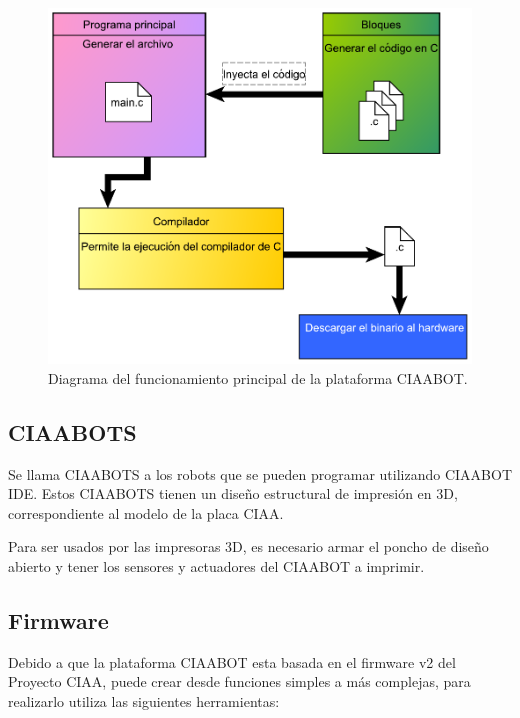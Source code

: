 \begin{figure}[!htbp]
	\begin{center}  %
		\includegraphics[scale=.50]{./Figures/diagrama-ciaabot.pdf}
		\par\caption{Diagrama del funcionamiento principal de la plataforma CIAABOT.}\label{fig:diagrama-ciaabot}
	\end{center}
\end{figure}




\subsection{CIAABOTS}
\label{subsec:CIAABOTS}

Se llama CIAABOTS a los robots que se pueden programar utilizando CIAABOT IDE. Estos CIAABOTS tienen un diseño estructural de impresión en 3D, correspondiente al modelo de la placa CIAA. 

Para ser usados por las impresoras 3D, es necesario armar el poncho de diseño abierto y tener los sensores y actuadores del CIAABOT a imprimir.

\subsection{Firmware}
\label{subsec:Firmware}

Debido a que la plataforma CIAABOT esta basada en el firmware v2 \citep{CIAA:firmwarev2} del Proyecto CIAA, puede crear desde funciones simples a más complejas, para realizarlo
utiliza las siguientes herramientas:

